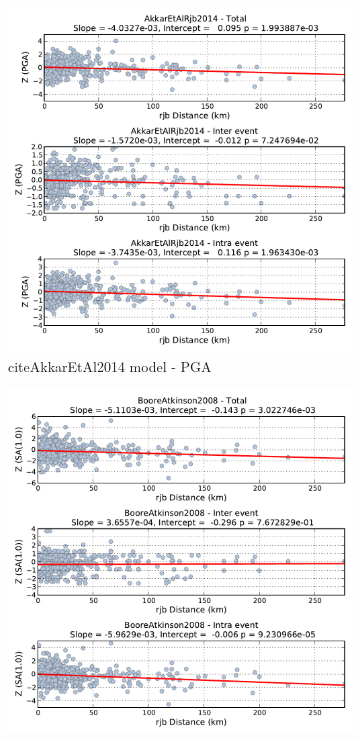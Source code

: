 \begin{figure}[htb]
\begin{subfigure}[b]{0.49\textwidth}
      \includegraphics[width=\textwidth]{./figures/residuals/Akkar2014_Distance_PGA.pdf}
      \caption{citeAkkarEtAl2014 model - PGA}
      \label{fig:pga_dist_akkar2014}
  \end{subfigure}
    \begin{subfigure}[b]{0.49\textwidth}
      \includegraphics[width=\textwidth]{./figures/residuals/BA2008_Distance_Sa1.pdf}

\end{subfigure}
\end{figure}
